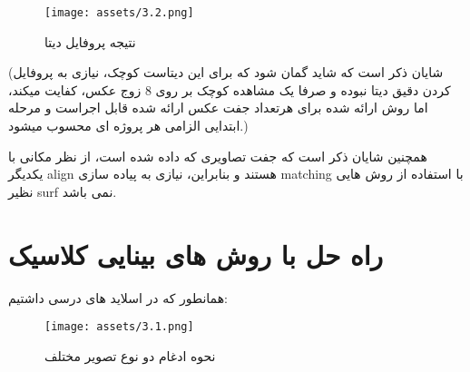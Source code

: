\documentclass[a4paper,12pt]{article}
\begin{document}
\begin{figure}[h]
	\centering
	\texttt{[image: assets/3.2.png]}
	\caption{\textcolor{CustomAccent}{نتیجه پروفایل دیتا}}
\end{figure}
(شایان ذکر است که شاید گمان شود که برای این دیتاست کوچک، نیازی به پروفایل کردن دقیق دیتا نبوده و صرفا یک مشاهده کوچک بر روی 8 زوج عکس، کفایت میکند، اما روش ارائه شده برای هرتعداد جفت عکس ارائه شده قابل اجراست و مرحله ابتدایی الزامی هر پروژه ای محسوب میشود.)

همچنین شایان ذکر است که جفت تصاویری که داده شده است، از نظر مکانی با یکدیگر align هستند و بنابراین، نیازی به پیاده سازی matching با استفاده از روش هایی نظیر surf نمی باشد.

\section*{راه حل با روش های بینایی کلاسیک}

همانطور که در اسلاید های درسی داشتیم:
\begin{figure}[h]
	\centering
	\texttt{[image: assets/3.1.png]}
	\caption{\textcolor{CustomAccent}{نحوه ادغام دو نوع تصویر مختلف}}
\end{figure}
\end{document}
